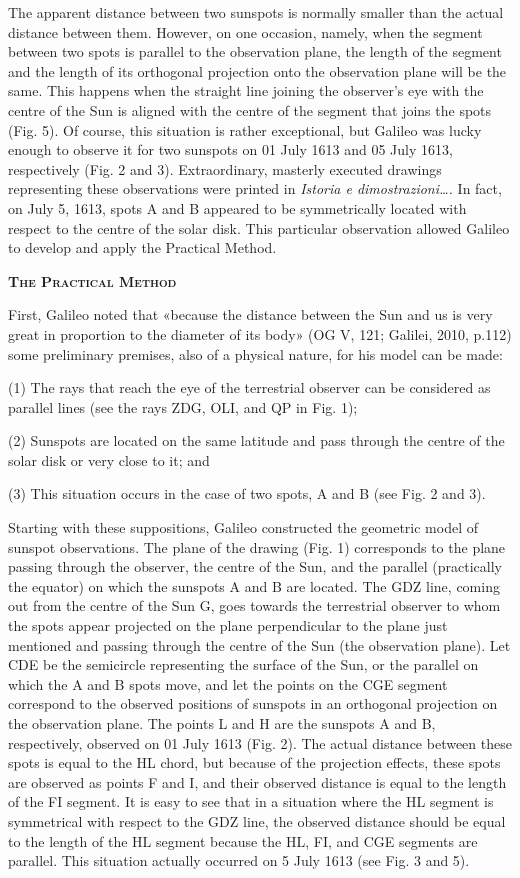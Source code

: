 \documentclass[a4paper]{article}
\begin{document}
The apparent distance between two sunspots is normally smaller than the actual distance between them. However, on one
occasion, namely, when the segment between two spots is parallel to the observation plane, the length of the segment
and the length of its orthogonal projection onto the observation plane will be the same. This happens when the straight
line joining the observer’s eye with the centre of the Sun is aligned with the centre of the segment that joins the
spots (Fig. 5). Of course, this situation is rather exceptional, but Galileo was lucky enough to observe it for two
sunspots on 01 July 1613 and 05 July 1613, respectively (Fig. 2 and 3). Extraordinary, masterly executed drawings
representing these observations were printed in \textit{Istoria e dimostrazioni…. }In fact, on July 5, 1613, spots A
and B appeared to be symmetrically located with respect to the centre of the solar disk. This particular observation
allowed Galileo to develop and apply the Practical Method. 

{\centering\bfseries\scshape
The Practical Method
\par}

First, Galileo noted that «because the distance between the Sun and us is very great in proportion to the diameter of
its body» \label{ref:RNDRTm53mTJKP}(OG V, 121; Galilei, 2010, p.112) some preliminary premises, also of a physical
nature, for his model can be made: 

(1) The rays that reach the eye of the terrestrial observer can be considered as parallel lines (see the rays ZDG, OLI,
and QP in Fig. 1);

(2) Sunspots are located on the same latitude and pass through the centre of the solar disk or very close to it; and

(3) This situation occurs in the case of two spots, A and B (see Fig. 2 and 3).

Starting with these suppositions, Galileo constructed the geometric model of sunspot observations. The plane of the
drawing (Fig. 1) corresponds to the plane passing through the observer, the centre of the Sun, and the parallel
(practically the equator) on which the sunspots A and B are located. The GDZ line, coming out from the centre of the
Sun G, goes towards the terrestrial observer to whom the spots appear projected on the plane perpendicular to the plane
just mentioned and passing through the centre of the Sun (the observation plane). Let CDE be the semicircle
representing the surface of the Sun, or the parallel on which the A and B spots move, and let the points on the CGE
segment correspond to the observed positions of sunspots in an orthogonal projection on the observation plane. The
points L and H are the sunspots A and B, respectively, observed on 01 July 1613 (Fig. 2). The actual distance between
these spots is equal to the HL chord, but because of the projection effects, these spots are observed as points F and
I, and their observed distance is equal to the length of the FI segment. It is easy to see that in a situation where
the HL segment is symmetrical with respect to the GDZ line, the observed distance should be equal to the length of the
HL segment because the HL, FI, and CGE segments are parallel. This situation actually occurred on 5 July 1613 (see Fig.
3 and 5).
\end{document}
